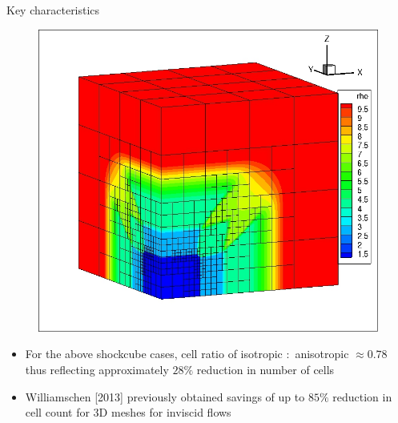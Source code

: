\documentclass{beamer}
\begin{document}
\begin{frame}
\begin{minipage}[t][1\textheight]{1\textwidth}
\begin{exampleblock}{Key characteristics}
\begin{figure}
{\includegraphics[width=0.6\textheight, trim=0cm 0cm 0 0cm,clip=true]{./figs/shockCubeIso3.jpg}}
\end{figure}
\vspace{-15pt}
\begin{itemize}
\tiny
\item For the above shockcube cases, cell ratio of isotropic $:$ anisotropic $\approx 0.78$ thus reflecting approximately $28 \%$ reduction in number of cells
\item Williamschen [2013] previously obtained savings of up to $85 \%$ reduction in cell count for 3D meshes for inviscid flows
\end{itemize}
\end{exampleblock}
\end{minipage}

\end{frame}

\end{document}
